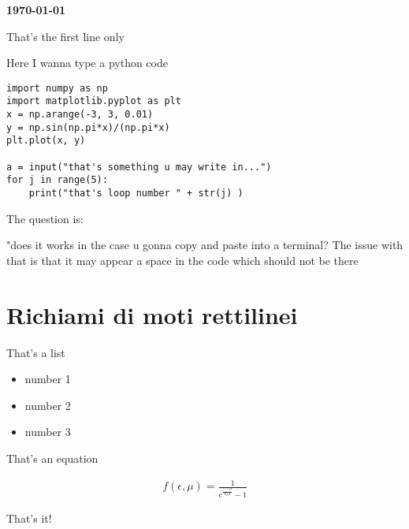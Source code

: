 \documentclass[17pt]{extarticle}
\begin{document}
\printindex

\begin{flushright}
{\bf \today}
\end{flushright}

\tableofcontents

\clearpage

That's the first line only


Here I wanna type a python code

\lstset{frame=lines}
\lstset{basicstyle=\footnotesize}
\lstset{columns=fullflexible} %
\begin{lstlisting}
import numpy as np
import matplotlib.pyplot as plt
x = np.arange(-3, 3, 0.01)
y = np.sin(np.pi*x)/(np.pi*x)
plt.plot(x, y)

a = input("that's something u may write in...")
for j in range(5):
	print("that's loop number " + str(j) )
\end{lstlisting}





The question is:

"does it works in the case u gonna copy and paste into a terminal? The issue with that is that it may appear a space in the code which should not be there

\section{Richiami di moti rettilinei}

That's a list
\begin{itemize}
	\item number 1
	\item number 2
	\item number 3
\end{itemize}

That's an equation 

\begin{eqnarray}
	f(\epsilon, \mu) = \frac{1}{e^{\frac{\epsilon - \mu}{k_BT}}-1}
\end{eqnarray}

That's it!
\end{document}
